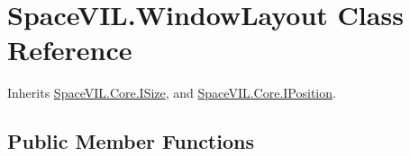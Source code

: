 \hypertarget{class_space_v_i_l_1_1_window_layout}{}\section{Space\+V\+I\+L.\+Window\+Layout Class Reference}
\label{class_space_v_i_l_1_1_window_layout}


Inherits \mbox{\hyperlink{interface_space_v_i_l_1_1_core_1_1_i_size}{Space\+V\+I\+L.\+Core.\+I\+Size}}, and \mbox{\hyperlink{interface_space_v_i_l_1_1_core_1_1_i_position}{Space\+V\+I\+L.\+Core.\+I\+Position}}.

\subsection*{Public Member Functions}
